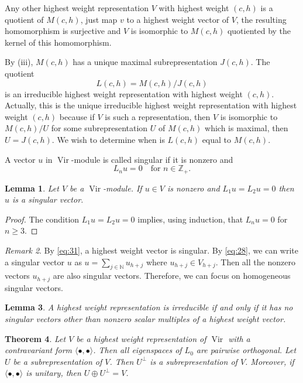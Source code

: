 \documentclass[a4paper, 12pt, reqno]{amsart}
\newtheorem{theorem}{Theorem}[subsection]
\newtheorem{lemma}[theorem]{Lemma}
\theoremstyle{remark}
\newtheorem{remark}[theorem]{Remark}
\numberwithin{equation}{subsection}
\DeclareMathOperator{\Vir}{Vir}
\begin{document}
Any other highest weight representation $V$ with highest weight $(c, h)$ is a quotient of $M(c, h)$, just map $v$ to a highest weight vector of $V$, the resulting homomorphism is surjective and $V$ is isomorphic to $M(c, h)$ quotiented by the kernel of this homomorphism.

By (iii), $M(c, h)$ has a unique maximal subrepresentation $J(c, h)$.
The quotient
\begin{equation*}
  L(c, h) = M(c, h)/J(c, h)
\end{equation*}
is an irreducible highest weight representation with highest weight $(c, h)$.
Actually, this is the unique irreducible highest weight representation with highest weight $(c, h)$ because if $V$ is such a representation, then $V$ is isomorphic to $M(c, h)/U$ for some subrepresentation $U$ of $M(c, h)$ which is maximal, then $U = J(c, h)$.
We wish to determine when is $L(c, h)$ equal to $M(c, h)$.

A vector $u$ in $\Vir$-module is called singular if it is nonzero and
\begin{equation}
  \label{eq:33}
  L_nu = 0 \quad \text{for }n \in \mathbb{Z}_+.
\end{equation}

\begin{lemma}
  \label{lmm:8}
  Let $V$ be a $\Vir$-module.
  If $u \in V$ is nonzero and $L_1u = L_2u = 0$ then $u$ is a singular vector. 
\end{lemma}

\begin{proof}
  The condition $L_1u = L_2u = 0$ implies, using induction, that $L_nu = 0$ for $n \ge 3$.
\end{proof}

\begin{remark}
  \label{rmk:22}
  By \eqref{eq:31}, a highest weight vector is singular. 
  By \eqref{eq:28}, we can  write a singular vector $u$ as $u = \sum_{j \in \mathbb{N}}u_{h + j}$ where $u_{h + j} \in V_{h + j}$.
  Then all the nonzero vectors $u_{h + j}$ are also singular vectors.
  Therefore, we can focus on homogeneous singular vectors.
\end{remark}

\begin{lemma}
  \label{lmm:9}
  A highest weight representation is irreducible if and only if it has no singular vectors other than nonzero scalar multiples of a highest weight vector.
\end{lemma}

\begin{theorem}
  \label{thr:23}
  Let $V$ be a highest weight representation of $\Vir$ with a contravariant form $\langle \bullet, \bullet\rangle$.
  Then all eigenspaces of $L_0$ are pairwise orthogonal.
  Let $U$ be a subrepresentation of $V$.
  Then $U^\perp$ is a subrepresentation of $V$.
  Moreover, if $\langle \bullet, \bullet\rangle$ is unitary, then $U\oplus U^\perp=V$.
\end{theorem}
\end{document}
